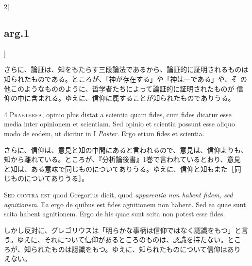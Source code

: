 \documentclass[paper=a4paper,fontsize=10pt,jafontsize=9pt,titlepage]{jlreq}
\begin{document}
\begin{paracol}{2}[\subsection{arg.1}]
\switchcolumn

さらに、論証は、知をもたらす三段論法であるから、論証的に証明されるものは
 知られたものである。ところが、「神が存在する」や「神は一である」や、そ
 の他このようなもののように、哲学者たちによって論証的に証明されたものが
 信仰の中に含まれる。ゆえに、信仰に属することが知られたものでありうる。


{\scshape 4 Praeterea}, opinio plus distat a
scientia quam fides, cum fides dicatur esse media inter opinionem et
scientiam. Sed opinio et scientia possunt esse aliquo modo de eodem, ut
dicitur in I {\itshape Poster}. Ergo etiam fides et scientia.

\switchcolumn

さらに、信仰は、意見と知の中間にあると言われるので、意見は、信仰よりも、
 知から離れている。ところが、『分析論後書』1巻で言われているとおり、意見
 と知は、ある意味で同じものについてありうる。ゆえに、信仰と知もまた［同
 じものについてありうる］。

\switchcolumn*[\subsection{s.c.}]

{\scshape Sed contra est} quod Gregorius dicit, quod {\itshape
apparentia non habent fidem, sed agnitionem}. Ea ergo de quibus est
fides agnitionem non habent. Sed ea quae sunt scita habent
agnitionem. Ergo de his quae sunt scita non potest esse fides.

\switchcolumn

しかし反対に、グレゴリウスは「明らかな事柄は信仰ではなく認識をもつ」と言
 う。ゆえに、それについて信仰があるところのものは、認識を持たない。とこ
 ろが、知られたものは認識をもつ。ゆえに、知られたものについて信仰はあり
 えない。



\end{paracol}
\end{document}
